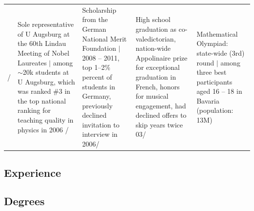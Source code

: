 \begin{longtable}[t]{R{\widthC} p{\widthB}}
/
& Sole representative of U Augsburg at the 60th Lindau Meeting of Nobel Laureates
{\footnotesize$\vert$ among $\sim$20k students at U Augsburg, which was ranked \#3 in the top national ranking for teaching quality in physics in 2006}  /
& Scholarship from the German National Merit Foundation {\footnotesize$\vert$ 2008 -- 2011, top 1--2\% percent of students in Germany, previously declined invitation to interview in 2006}/
&
High school graduation as co-valedictorian, nation-wide Appolinaire prize for exceptional graduation in French, honors for musical engagement, had declined offers to skip years twice\newline
03/
& Mathematical Olympiad: state-wide (3rd) round {\footnotesize$\vert$ among three best participants aged 16 -- 18 in Bavaria (population: 13M)}
\end{longtable}

\newpage

\subsection*{Experience }
\vspace{.0em}


\subsection*{Degrees}\vspace{-1em}

